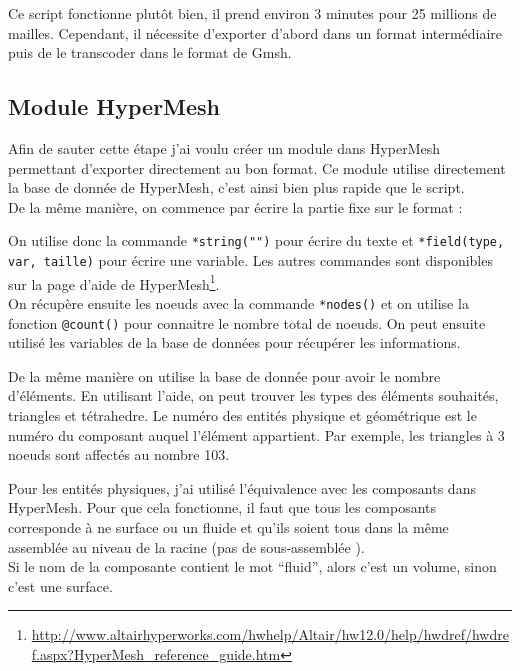 Ce script fonctionne plutôt bien, il prend environ 3 minutes pour 25 millions de mailles. Cependant, il nécessite d'exporter d'abord dans un format intermédiaire puis de le transcoder dans le format de Gmsh. 

\subsection{Module HyperMesh} 

Afin de sauter cette étape j'ai voulu créer un module dans HyperMesh permettant d'exporter directement au bon format. Ce module utilise directement la base de donnée de HyperMesh, c'est ainsi bien plus rapide que le script.\\
De la même manière, on commence par écrire la partie fixe sur le format :


On utilise donc la commande \texttt{*string("")} pour écrire du texte et \texttt{*field(type, var, taille)} pour écrire une variable. Les autres commandes sont disponibles sur la page d'aide de HyperMesh\footnote{\url{http://www.altairhyperworks.com/hwhelp/Altair/hw12.0/help/hwdref/hwdref.aspx?HyperMesh\_reference\_guide.htm}}.\\
On récupère ensuite les noeuds avec la commande \texttt{*nodes()} et on utilise la fonction \texttt{@count()} pour connaitre le nombre total de noeuds. On peut ensuite utilisé les variables de la base de données pour récupérer les informations.


De la même manière on utilise la base de donnée pour avoir le nombre d'éléments. En utilisant l'aide, on peut trouver les types des éléments souhaités, triangles et tétrahedre. Le numéro des entités physique et géométrique est le numéro du composant auquel l'élément appartient. Par exemple, les triangles à 3 noeuds sont affectés au nombre 103.


Pour les entités physiques, j'ai utilisé l'équivalence avec les composants dans HyperMesh. Pour que cela fonctionne, il faut que tous les composants corresponde à ne surface ou un fluide et qu'ils soient tous dans la même assemblée au niveau de la racine (pas de sous-assemblée ).\\
Si le nom de la composante contient le mot ``fluid'', alors c'est un volume, sinon c'est une surface.


